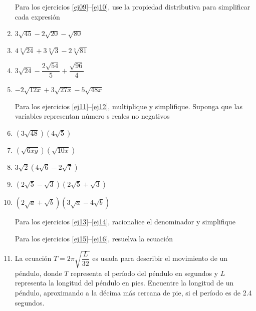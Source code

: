 \documentclass[letterpaper,twoside]{article}
\begin{document}
\begin{multicols}{2}
\begin{enumerate}
Para los ejercicios \ref{ej09}--\ref{ej10}, use la propiedad distributiva para simplificar cada expresión
\item \label{ej09} $3\sqrt{45}-2\sqrt{20}-\sqrt{80}$
\item $4\sqrt[3]{24}+3\sqrt[3]{3}-2\sqrt[3]{81}$
\item $3\sqrt{24}-\dfrac{2\sqrt{54}}{5}+\dfrac{\sqrt{96}}{4}$
\item \label{ej10} $-2\sqrt{12x}+3\sqrt{27x}-5\sqrt{48x}$

Para los ejercicios \ref{ej11}--\ref{ej12}, multiplique y simplifique. Suponga que las variables representan número s reales no negativos
\item \label{ej11} $(3\sqrt{48})(4\sqrt{5})$
\item $(\sqrt{6xy})(\sqrt{10x})$
\item $3\sqrt{2}(4\sqrt{6}-2\sqrt{7})$
\item $(2\sqrt{5}-\sqrt{3})(2\sqrt{5}+\sqrt{3})$
\item \label{ej12} $(2\sqrt{a}+\sqrt{b})(3\sqrt{a}-4\sqrt{b})$

Para los ejercicios \ref{ej13}--\ref{ej14}, racionalice el denominador y simplifique

Para los ejercicios \ref{ej15}--\ref{ej16}, resuelva la ecuación
\item La ecuación $T=2\pi\sqrt{\dfrac{L}{32}}$ es usada para describir el movimiento de un péndulo, donde $T$ representa el período del péndulo en segundos y $L$ representa la longitud del péndulo en pies. Encuentre la longitud de un péndulo, aproximando a la décima más cercana de pie, si el período es de 2.4 segundos.


\end{enumerate}
\end{multicols}
\end{document}
